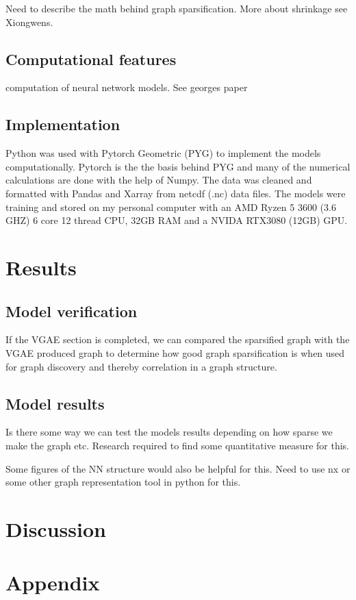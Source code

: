 \documentclass[honours,12pt]{unswthesis}
\numberwithin{equation}{section}
\begin{document}

Need to describe the math behind graph sparsification. More about shrinkage see Xiongwens.

{\section{Computational features}}\label{computation}
computation of neural network models. See georges paper 

{\section{Implementation}}\label{implementation}

{\noindent}Python was used with Pytorch Geometric (PYG) to implement the models computationally.
Pytorch is the the basis behind PYG and many of the numerical calculations are done with the help of Numpy.
The data was cleaned and formatted with Pandas and Xarray from netcdf (.nc) data files.
The models were training and stored on my personal computer with an AMD Ryzen 5 3600 (3.6 GHZ) 6 core 12 thread CPU, 32GB RAM and a NVIDA RTX3080 (12GB) GPU. 

\chapter{Results}\label{results}

{\section{Model verification}}\label{model-verification}
If the VGAE section is completed, we can compared the sparsified graph with the VGAE
produced graph to determine how good graph sparsification is when used for graph discovery
and thereby correlation in a graph structure.

{\section{Model results}}\label{model-results}
Is there some way we can test the models results depending on how sparse we make the graph etc.
Research required to find some quantitative measure for this.

Some figures of the NN structure would also be helpful for this.
Need to use nx or some other graph representation tool in python for this.

\chapter{Discussion}\label{dis}

\chapter{Appendix}\label{app}



\clearpage
{}
{}

\end{document}
